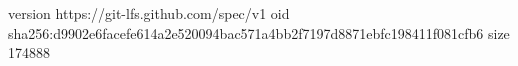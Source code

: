 version https://git-lfs.github.com/spec/v1
oid sha256:d9902e6facefe614a2e520094bac571a4bb2f7197d8871ebfc198411f081cfb6
size 174888
